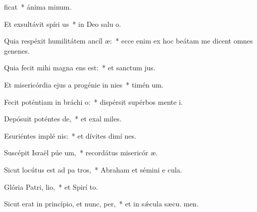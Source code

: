 \item {}ficat~* ánima  minum.
\item Et exsultávit spíri us~* in Deo salu o.
\item Quia respéxit humilitátem ancíl æ:~* ecce enim ex hoc beátam me dicent omnes genenes.
\item Quia fecit mihi magna  ens est:~* et sanctum  jus.
\item Et misericórdia ejus a progénie in nies~* timén um.
\item Fecit poténtiam in bráchi o:~* dispérsit supérbos mente  i.
\item Depósuit poténtes  de,~* et exal miles.
\item Esuriéntes implé nis:~* et dívites dimí nes.
\item Suscépit Israël púe um,~* recordátus misericór æ.
\item Sicut locútus est ad pa tros,~* Abraham et sémini e  cula.
\item Glória Patri,  lio,~* et Spirí to.
\item Sicut erat in princípio, et nunc,  per,~* et in sǽcula sæcu. men.
